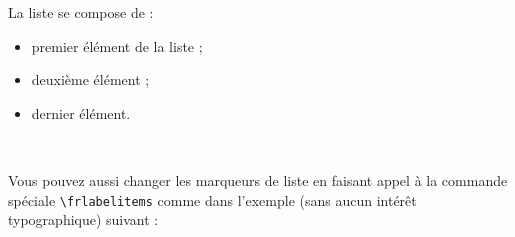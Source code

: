 \documentclass[a4paper,12pt,openright]{article}
\begin{document}
\begin{center}
{{\begin{minipage}{55mm}
La liste se compose de :
\begin{itemize}
\item premier élément de la liste ;
\item deuxième élément ;
\item dernier élément.
\end{itemize}

\end{minipage}
}
}\\[1.5em]
%
\end{center} %

Vous pouvez aussi changer les marqueurs de liste en faisant appel à la
commande spéciale \verb|\frlabelitems| comme dans l’exemple (sans aucun intérêt typographique)
suivant :
\end{document}
